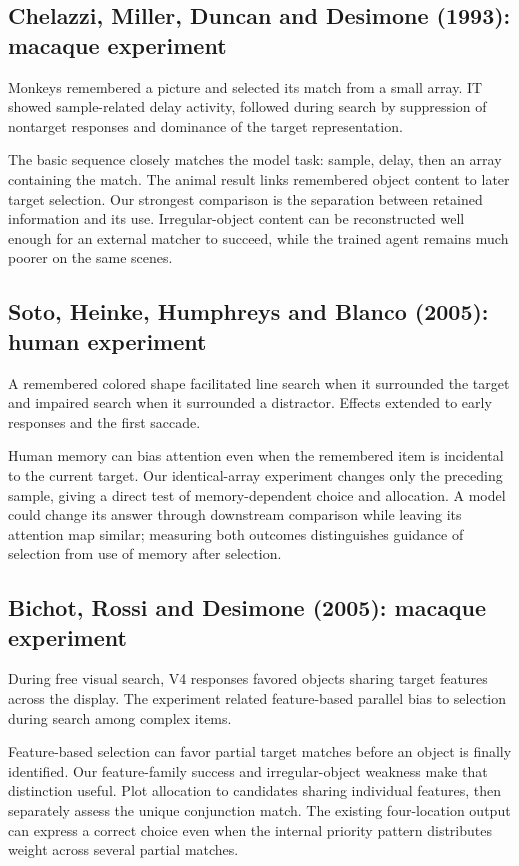 \documentclass[11pt]{article}
\begin{document}
\subsection{Chelazzi, Miller, Duncan and Desimone (1993): macaque experiment}
Monkeys remembered a picture and selected its match from a small array. IT showed sample-related delay activity, followed during search by suppression of nontarget responses and dominance of the target representation. \cite{bio_chelazzi}

The basic sequence closely matches the model task: sample, delay, then an array containing the match. The animal result links remembered object content to later target selection. Our strongest comparison is the separation between retained information and its use. Irregular-object content can be reconstructed well enough for an external matcher to succeed, while the trained agent remains much poorer on the same scenes.

\subsection{Soto, Heinke, Humphreys and Blanco (2005): human experiment}
A remembered colored shape facilitated line search when it surrounded the target and impaired search when it surrounded a distractor. Effects extended to early responses and the first saccade. \cite{bio_soto}

Human memory can bias attention even when the remembered item is incidental to the current target. Our identical-array experiment changes only the preceding sample, giving a direct test of memory-dependent choice and allocation. A model could change its answer through downstream comparison while leaving its attention map similar; measuring both outcomes distinguishes guidance of selection from use of memory after selection.

\subsection{Bichot, Rossi and Desimone (2005): macaque experiment}
During free visual search, V4 responses favored objects sharing target features across the display. The experiment related feature-based parallel bias to selection during search among complex items. \cite{bio_bichot}

Feature-based selection can favor partial target matches before an object is finally identified. Our feature-family success and irregular-object weakness make that distinction useful. Plot allocation to candidates sharing individual features, then separately assess the unique conjunction match. The existing four-location output can express a correct choice even when the internal priority pattern distributes weight across several partial matches.
\end{document}
